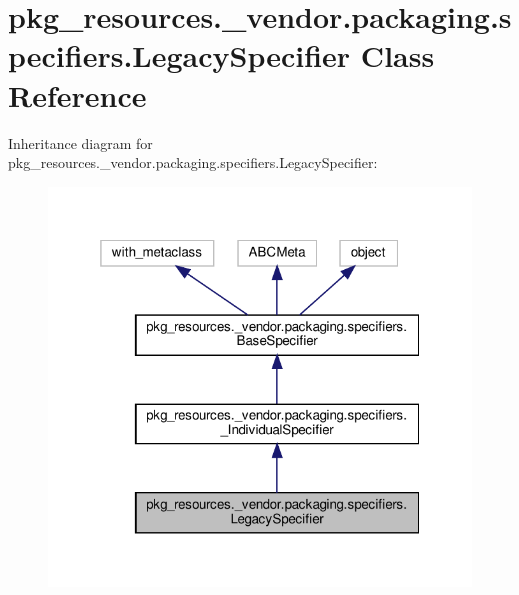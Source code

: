 \hypertarget{classpkg__resources_1_1__vendor_1_1packaging_1_1specifiers_1_1LegacySpecifier}{}\section{pkg\+\_\+resources.\+\_\+vendor.\+packaging.\+specifiers.\+Legacy\+Specifier Class Reference}
\label{classpkg__resources_1_1__vendor_1_1packaging_1_1specifiers_1_1LegacySpecifier}


Inheritance diagram for pkg\+\_\+resources.\+\_\+vendor.\+packaging.\+specifiers.\+Legacy\+Specifier\+:
\nopagebreak
\begin{figure}[H]
\begin{center}
\leavevmode
\includegraphics[width=319pt]{classpkg__resources_1_1__vendor_1_1packaging_1_1specifiers_1_1LegacySpecifier__inherit__graph}
\end{center}
\end{figure}


